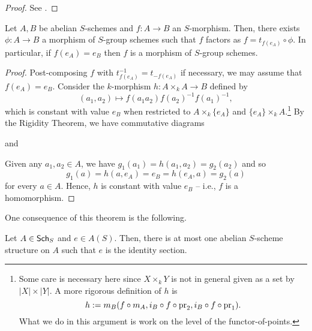 \documentclass[11pt]{article}
\begin{document}
\begin{proof}
See \cite[\textrm{Thm 1.7.1}]{Conrad}.
\end{proof}

\begin{corollary}\label{abelian_morphisms}
Let $A,B$ be abelian $S$-schemes and $f: A\to B$ an $S$-morphism. Then, there exists $\phi: A\to B$ a morphism of $S$-group schemes such that $f$ factors as $f=t_{f(e_A)}\circ\phi$. In particular, if $f(e_A)=e_B$ then $f$ is a morphism of $S$-group schemes.
\end{corollary}

\begin{proof}
Post-composing $f$ with $t_{f(e_A)}^{-1}=t_{-f(e_A)}$ if necessary, we may assume that $f(e_A)=e_B$. Consider the $k$-morphism $h: A\times_kA\to B$ defined by 
$$(a_1,a_2)\mapsto f(a_1a_2)f(a_2)^{-1}f(a_1)^{-1},$$
which is constant with value $e_B$ when restricted to $A\times_k\{e_A\}$ and $\{e_A\}\times_kA$.\footnote{Some care is necessary here since $X\times_kY$ is not in general given as a set by $|X|\times|Y|$. A more rigorous definition of $h$ is 
$$h:=m_B(f\circ m_A,i_B\circ f\circ\operatorname{pr}_2,i_B\circ f\circ\operatorname{pr}_1).$$
What we do in this argument is work on the level of the functor-of-points.} By the Rigidity Theorem, we have commutative diagrams
\begin{center}
\end{center}
and
\begin{center}
\end{center}
Given any $a_1,a_2\in A$, we have $g_1(a_1)=h(a_1,a_2)=g_2(a_2)$ and so 
$$g_1(a)=h(a,e_A)=e_B=h(e_A,a)=g_2(a)$$
for every $a\in A$. Hence, $h$ is constant with value $e_B$ -- i.e., $f$ is a homomorphism.
\end{proof}

One consequence of this theorem is the following.

\begin{corollary}\label{abelian_structure_unique}
Let $A\in\operatorname{\mathsf{Sch}}_S$ and $e\in A(S)$. Then, there is at most one abelian $S$-scheme structure on $A$ such that $e$ is the identity section.
\end{corollary}
\end{document}
